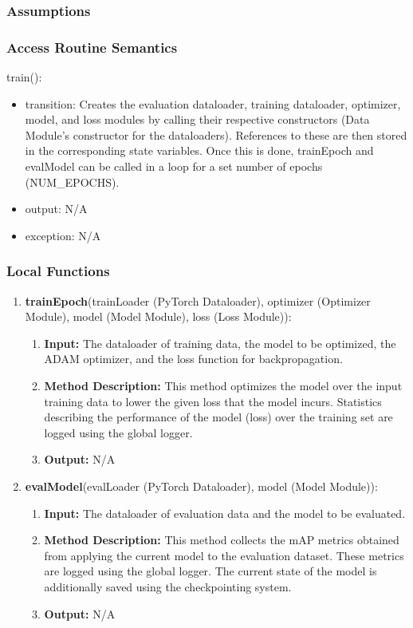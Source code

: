 \documentclass[12pt, titlepage]{article}
\begin{document}
\subsubsection{Assumptions}


\subsubsection{Access Routine Semantics}


\noindent train():
\begin{itemize}
\item transition: Creates the evaluation dataloader, training dataloader, optimizer, model, and loss modules by calling their respective constructors (Data Module's constructor for the dataloaders). References to these are then stored in the corresponding state variables. Once this is done, trainEpoch and evalModel can be called in a loop for a set number of epochs (NUM\_EPOCHS).
\item output: N/A
\item exception: N/A
\end{itemize}

\subsubsection{Local Functions}

\begin{enumerate}
  \item \textbf{trainEpoch}(trainLoader (PyTorch Dataloader), optimizer (Optimizer Module), model (Model Module), loss (Loss Module)):
  \begin{enumerate}
    \item \textbf{Input:} The dataloader of training data, the model to be optimized, the ADAM optimizer, and the loss function for backpropagation.
    \item \textbf{Method Description:} This method optimizes the model over the input training data to lower the given loss that the model incurs. 
    Statistics describing the performance of the model (loss) over the training set are logged using the global logger.
    \item \textbf{Output:} N/A 
  \end{enumerate}
  \item \textbf{evalModel}(evalLoader (PyTorch Dataloader), model (Model Module)):
  \begin{enumerate}
    \item \textbf{Input:} The dataloader of evaluation data and the model to be evaluated.
    \item \textbf{Method Description:} This method collects the mAP metrics obtained from applying the current model to the evaluation dataset. These
    metrics are logged using the global logger. The current state of the model is additionally saved using the checkpointing system.
    \item \textbf{Output:} N/A
  \end{enumerate}
\end{enumerate}
\end{document}
